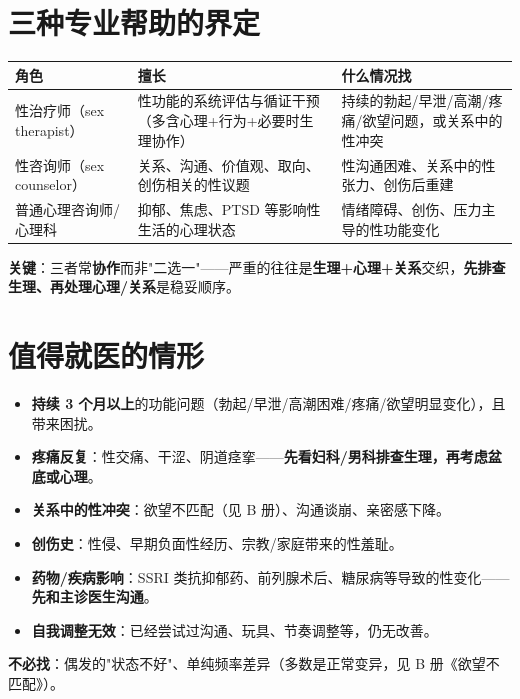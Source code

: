 \documentclass[12pt,UTF8,openany]{ctexbook}
\begin{document}
\section{三种专业帮助的界定}
\begin{tabularx}{\textwidth}{X X X}
\toprule
\textbf{角色} & \textbf{擅长} & \textbf{什么情况找} \\
\midrule
性治疗师（sex therapist） & 性功能的系统评估与循证干预（多含心理+行为+必要时生理协作） & 持续的勃起/早泄/高潮/疼痛/欲望问题，或关系中的性冲突 \\
性咨询师（sex counselor） & 关系、沟通、价值观、取向、创伤相关的性议题 & 性沟通困难、关系中的性张力、创伤后重建 \\
普通心理咨询师/心理科 & 抑郁、焦虑、PTSD 等影响性生活的心理状态 & 情绪障碍、创伤、压力主导的性功能变化 \\
\bottomrule
\end{tabularx}
\par\smallskip
\textbf{关键}：三者常\textbf{协作}而非"二选一"——严重的往往是\textbf{生理+心理+关系}交织，\textbf{先排查生理、再处理心理/关系}是稳妥顺序。

\section{值得就医的情形}
\begin{itemize}[leftmargin=2em,itemsep=0.3em]
  \item \textbf{持续 3 个月以上}的功能问题（勃起/早泄/高潮困难/疼痛/欲望明显变化），且带来困扰。
  \item \textbf{疼痛反复}：性交痛、干涩、阴道痉挛——\textbf{先看妇科/男科排查生理，再考虑盆底或心理}。
  \item \textbf{关系中的性冲突}：欲望不匹配（见 B 册）、沟通谈崩、亲密感下降。
  \item \textbf{创伤史}：性侵、早期负面性经历、宗教/家庭带来的性羞耻。
  \item \textbf{药物/疾病影响}：SSRI 类抗抑郁药、前列腺术后、糖尿病等导致的性变化——\textbf{先和主诊医生沟通}。
  \item \textbf{自我调整无效}：已经尝试过沟通、玩具、节奏调整等，仍无改善。
\end{itemize}
\textbf{不必找}：偶发的"状态不好"、单纯频率差异（多数是正常变异，见 B 册《欲望不匹配》）。
\end{document}
